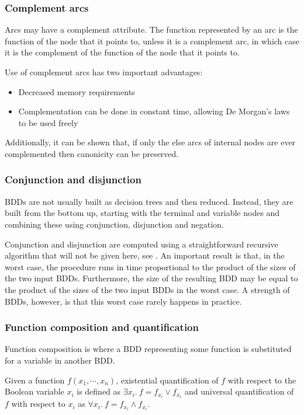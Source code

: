 \subsubsection{Complement arcs}

Arcs may have a complement attribute. The function represented by an arc is the function of the node that it points to, unless it is a complement arc, in which case it is the complement of the function of the node that it points to.

Use of complement arcs has two important advantages:
\begin{itemize}
    \item Decreased memory requirements
    \item Complementation can be done in constant time, allowing De Morgan's laws to be used freely
\end{itemize}

Additionally, it can be shown that, if only the else arcs of internal nodes are ever complemented then canonicity can be preserved.

\subsubsection{Conjunction and disjunction}

BDDs are not usually built as decision trees and then reduced. Instead, they are built from the bottom up, starting with the terminal and variable nodes and combining these using conjunction, disjunction and negation.

Conjunction and disjunction are computed using a straightforward recursive algorithm that will not be given here, see \cite{Bryant_86}. An important result is that, in the worst case, the procedure runs in time proportional to the product of the sizes of the two input BDDs. Furthermore, the size of the resulting BDD may be equal to the product of the sizes of the two input BDDs in the worst case. A strength of BDDs, however, is that this worst case rarely happens in practice. 

\subsubsection{Function composition and quantification}

Function composition is where a BDD representing some function is substituted for a variable in another BDD.

Given a function $f(x_1,\cdots,x_n)$, existential quantification of $f$ with respect to the Boolean variable $x_i$ is defined as $\exists x_i.\ f = f_{x_i} \vee f_{\overline{x_i}}$ and universal quantification of $f$ with respect to $x_i$ as $\forall x_i.\ f = f_{x_i} \wedge f_{\overline{x_i}}$.

